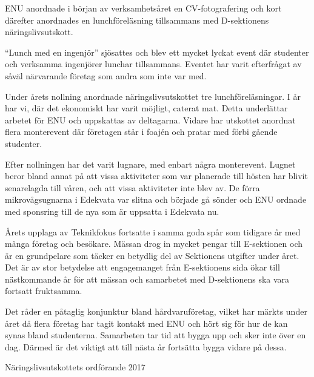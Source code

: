 \documentclass[../_main/handlingar.tex]{subfiles}
\begin{document}
ENU anordnade i början av verksamhetsåret en CV-fotografering och kort därefter anordnades en lunchföreläsning tillsammans med D-sektionens näringslivsutskott.

``Lunch med en ingenjör'' sjösattes och blev ett mycket lyckat event där studenter och verksamma ingenjörer lunchar tillsammans. Eventet har varit efterfrågat av såväl närvarande företag som andra som inte var med.

Under årets nollning anordnade näringslivsutskottet tre lunchföreläsningar. I år har vi, där det ekonomiskt har varit möjligt, caterat mat. Detta underlättar arbetet för ENU och uppskattas av deltagarna. Vidare har utskottet anordnat flera monterevent där företagen står i foajén och pratar med förbi gående studenter.

Efter nollningen har det varit lugnare, med enbart några monterevent. Lugnet beror bland annat på att vissa aktiviteter som var planerade till hösten har blivit senarelagda till våren, och att vissa aktiviteter inte blev av. De förra mikrovågsugnarna i Edekvata var slitna och började gå sönder och ENU ordnade med sponsring till de nya som är uppsatta i Edekvata nu.

Årets upplaga av Teknikfokus fortsatte i samma goda spår som tidigare år med många företag och besökare. Mässan drog in mycket pengar till E-sektionen och är en grundpelare som täcker en betydlig del av Sektionens utgifter under året. Det är av stor betydelse att engagemanget från E-sektionens sida ökar till nästkommande år för att mässan och samarbetet med D-sektionens ska vara fortsatt fruktsamma.

Det råder en påtaglig konjunktur bland hårdvaruföretag, vilket har märkts under året då flera företag har tagit kontakt med ENU och hört sig för hur de kan synas bland studenterna. Samarbeten tar tid att bygga upp och sker inte över en dag. Därmed är det viktigt att till nästa år fortsätta bygga vidare på dessa.
\begin{signatures}{1}
    \mvh
    \signature{Josefine Sandström}{Näringslivsutskottets ordförande 2017}
\end{signatures}
\end{document}

